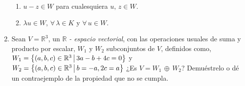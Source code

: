 \documentclass[fleqn]{article}
\begin{document}
\begin{enumerate}
        \begin{enumerate}
            \item $ u - z \in W $ para cualesquiera $ u, \, z \in W $.
            
            \item $ \lambda u \in W $, $ \forall \, \lambda \in K $ y $ \forall \, u \in W $.
        \end{enumerate}

        \item Sean $ V = \mathbb{R}^3 $, un $ \mathbb{R} $ \textsl{- espacio vectorial}, con las operaciones usuales de suma y producto por escalar, $ W_1 $ y $ W_2 $ subconjuntos de $ V $, definidos como, $ W_1 = \left \{(a,b,c) \in \mathbb{R}^3 \middle \arrowvert 3a-b+4c=0 \right \} $ y $ W_2 = \left \{(a,b,c) \in \mathbb{R}^3 \middle \arrowvert b=-a, 2c=a \right \} $ ¿Es $ V = W_1 \, \oplus \, W_2 $? Demuéstrelo o dé un contraejemplo de la propiedad que no se cumpla.
        
    \end{enumerate}
\end{document}
